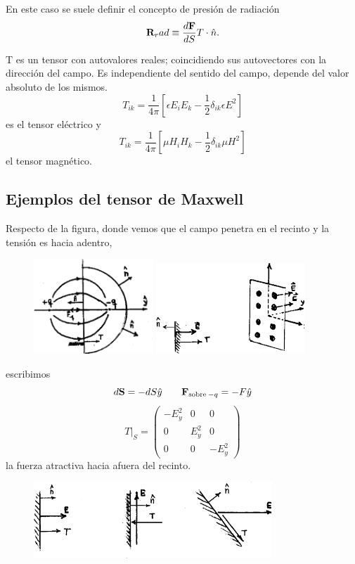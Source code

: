 \documentclass[10pt,oneside]{CBFT_book}
\begin{document}
En este caso se suele definir el concepto de presión de radiación
\[
	\vb{R}_rad \equiv \dtot{\vb{F}}{S} T\cdot\hat{n}.
\]

T es un tensor con autovalores reales; coincidiendo sus autovectores con la dirección del campo.
Es independiente del sentido del campo, depende del valor absoluto de los mismos.
\[
	T_{ik} = \frac{1}{4\pi} \left[ \epsilon E_iE_k - \frac{1}{2}\delta_{ik} \epsilon E^2 \right] 
\]
es el tensor eléctrico y
\[
	T_{ik} = \frac{1}{4\pi} \left[ \mu H_iH_k - \frac{1}{2}\delta_{ik} \mu H^2  \right] 
\]
el tensor magnético.

\subsection{Ejemplos del tensor de Maxwell}

Respecto de la figura, donde vemos que el campo penetra en el recinto y la tensión es hacia adentro,
\begin{figure}[htb]
	\begin{center}
	\includegraphics[width=0.4\textwidth]{images/fig_ft1_tensorM1.pdf}
	\includegraphics[width=0.5\textwidth]{images/fig_ft1_tensorM2.pdf}	
	\end{center}
	\caption{}
\end{figure} 
escribimos 
\[
	d\vb{S} = -dS\hat{y} \qquad \vb{F}_{\text{sobre}\:-q} = -F\hat{y}
\]
\[
	T|_S = \begin{pmatrix}
	        -E_y^2	& 0 	& 0 \\
		0	& E_y^2	& 0 \\
		0	& 0	& -E_y^2
	       \end{pmatrix}
\]
la fuerza atractiva hacia afuera del recinto.
\begin{figure}[htb]
	\begin{center}
	\includegraphics[width=0.8\textwidth]{images/fig_ft1_tensorM3.pdf}	 
	\end{center}
	\caption{}
\end{figure} 
\end{document}
